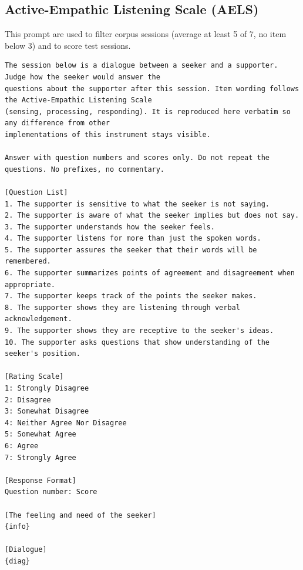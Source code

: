 \documentclass[journal]{IEEEtran}
\begin{document}
\subsection{Active-Empathic Listening Scale (AELS)}
This prompt are used to filter corpus sessions (average at least 5 of 7, no item below 3) and to score test sessions.
\begin{lstlisting}
The session below is a dialogue between a seeker and a supporter. Judge how the seeker would answer the
questions about the supporter after this session. Item wording follows the Active-Empathic Listening Scale
(sensing, processing, responding). It is reproduced here verbatim so any difference from other
implementations of this instrument stays visible.

Answer with question numbers and scores only. Do not repeat the questions. No prefixes, no commentary.

[Question List]
1. The supporter is sensitive to what the seeker is not saying.
2. The supporter is aware of what the seeker implies but does not say.
3. The supporter understands how the seeker feels.
4. The supporter listens for more than just the spoken words.
5. The supporter assures the seeker that their words will be remembered.
6. The supporter summarizes points of agreement and disagreement when appropriate.
7. The supporter keeps track of the points the seeker makes.
8. The supporter shows they are listening through verbal acknowledgement.
9. The supporter shows they are receptive to the seeker's ideas.
10. The supporter asks questions that show understanding of the seeker's position.

[Rating Scale]
1: Strongly Disagree
2: Disagree
3: Somewhat Disagree
4: Neither Agree Nor Disagree
5: Somewhat Agree
6: Agree
7: Strongly Agree

[Response Format]
Question number: Score

[The feeling and need of the seeker]
{info}

[Dialogue]
{diag}
\end{lstlisting}
\end{document}
